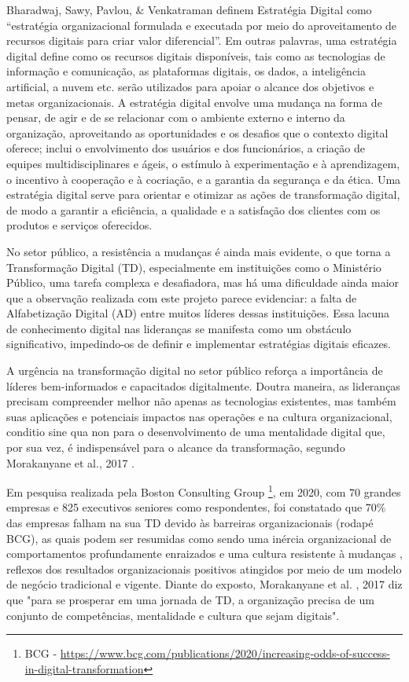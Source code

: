 Bharadwaj, Sawy, Pavlou, \& Venkatraman \cite{bharadwaj2013digital} definem Estratégia Digital como “estratégia organizacional formulada e executada por meio do aproveitamento de recursos digitais para criar valor diferencial”. Em outras palavras, uma estratégia digital define como os recursos digitais disponíveis, tais como as tecnologias de informação e comunicação, as plataformas digitais, os dados, a inteligência artificial, a nuvem etc. serão utilizados para apoiar o alcance dos objetivos e metas organizacionais. A estratégia digital envolve uma mudança na forma de pensar, de agir e de se relacionar com o ambiente externo e interno da organização, aproveitando as oportunidades e os desafios que o contexto digital oferece; inclui o envolvimento dos usuários e dos funcionários, a criação de equipes multidisciplinares e ágeis, o estímulo à experimentação e à aprendizagem, o incentivo à cooperação e à cocriação, e a garantia da segurança e da ética. Uma estratégia digital serve para orientar e otimizar as ações de transformação digital, de modo a garantir a eficiência, a qualidade e a satisfação dos clientes com os produtos e serviços oferecidos.

No setor público, a resistência a mudanças é ainda mais evidente, o que torna a Transformação Digital (TD), especialmente em instituições como o Ministério Público, uma tarefa complexa e desafiadora, mas há uma dificuldade ainda maior que a observação realizada com este projeto parece evidenciar: a falta de Alfabetização Digital (AD) entre muitos líderes dessas instituições. Essa lacuna de conhecimento digital nas lideranças se manifesta como um obstáculo significativo, impedindo-os de definir e implementar estratégias digitais eficazes. 

A urgência na transformação digital no setor público reforça a importância de líderes bem-informados e capacitados digitalmente. Doutra maneira, as lideranças precisam compreender melhor não apenas as tecnologias existentes, mas também suas aplicações e potenciais impactos nas operações e na cultura organizacional, conditio sine qua non para o desenvolvimento de uma mentalidade digital que, por sua vez, é indispensável para o alcance da transformação, segundo Morakanyane et al., 2017 \cite{bharadwaj2013digital}.

Em pesquisa realizada pela Boston Consulting Group \footnote {BCG -  \url{https://www.bcg.com/publications/2020/increasing-odds-of-success-in-digital-transformation}}, em 2020, com 70 grandes empresas e 825 executivos seniores como respondentes, foi constatado que 70\% das empresas falham na sua TD devido às barreiras organizacionais (rodapé BCG), as quais podem ser resumidas como sendo uma inércia organizacional de comportamentos profundamente enraizados e uma cultura resistente à mudanças \cite{vial2021understanding}, reflexos dos resultados organizacionais positivos atingidos por meio de um modelo de negócio tradicional e vigente. Diante do exposto, Morakanyane et al. \cite{bharadwaj2013digital}, 2017 diz que "para se prosperar em uma jornada de TD, a organização precisa de um conjunto de competências, mentalidade e cultura que sejam digitais".


